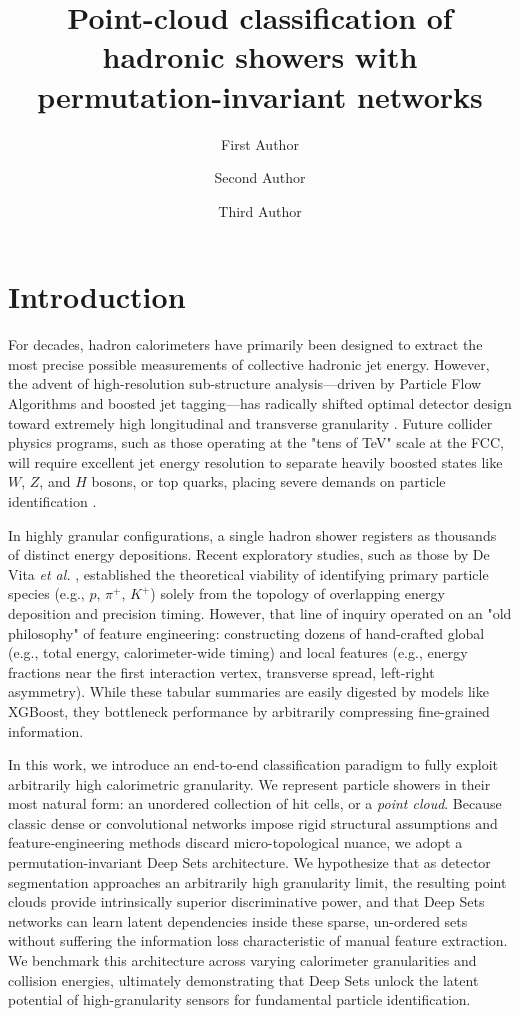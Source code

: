 \documentclass[11pt,a4paper]{article}
\title{Point-cloud classification of hadronic showers with permutation-invariant networks}
\author[a]{First Author}
\author[a,b]{Second Author}
\author[a]{Third Author}
\affiliation[a]{Department of Physics, University of Tennessee, Knoxville, TN, USA}
\affiliation[b]{Institute/Center, City, Country}
\newcommand{\deepset}{Deep Sets\xspace}
\begin{document}
\maketitle
\flushbottom

\section{Introduction}
\label{sec:intro}
For decades, hadron calorimeters have primarily been designed to extract the most precise possible measurements of collective hadronic jet energy. However, the advent of high-resolution sub-structure analysis---driven by Particle Flow Algorithms and boosted jet tagging---has radically shifted optimal detector design toward extremely high longitudinal and transverse granularity \cite{particles8020058}. Future collider physics programs, such as those operating at the "tens of TeV" scale at the FCC, will require excellent jet energy resolution to separate heavily boosted states like $W$, $Z$, and $H$ bosons, or top quarks, placing severe demands on particle identification \cite{particles8020058}.

In highly granular configurations, a single hadron shower registers as thousands of distinct energy depositions. Recent exploratory studies, such as those by De Vita \textit{et al.} \cite{particles8020058}, established the theoretical viability of identifying primary particle species (e.g., $p$, $\pi^+$, $K^+$) solely from the topology of overlapping energy deposition and precision timing. However, that line of inquiry operated on an "old philosophy" of feature engineering: constructing dozens of hand-crafted global (e.g., total energy, calorimeter-wide timing) and local features (e.g., energy fractions near the first interaction vertex, transverse spread, left-right asymmetry). While these tabular summaries are easily digested by models like XGBoost, they bottleneck performance by arbitrarily compressing fine-grained information.

In this work, we introduce an end-to-end classification paradigm to fully exploit arbitrarily high calorimetric granularity. We represent particle showers in their most natural form: an unordered collection of hit cells, or a \textit{point cloud}. Because classic dense or convolutional networks impose rigid structural assumptions and feature-engineering methods discard micro-topological nuance, we adopt a permutation-invariant \deepset{} architecture. We hypothesize that as detector segmentation approaches an arbitrarily high granularity limit, the resulting point clouds provide intrinsically superior discriminative power, and that \deepset networks can learn latent dependencies inside these sparse, un-ordered sets without suffering the information loss characteristic of manual feature extraction. We benchmark this architecture across varying calorimeter granularities and collision energies, ultimately demonstrating that Deep Sets unlock the latent potential of high-granularity sensors for fundamental particle identification.
\end{document}
